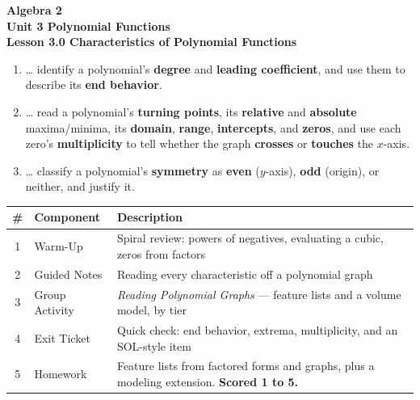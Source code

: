 \documentclass[10pt]{article}
\begin{document}
\vspace{-0.8in}

\begin{center}
  {\color{white}\textbf{\LARGE Algebra 2}}\\[4pt]
  {\color{forestmid}\large\textbf{Unit 3 \quad Polynomial Functions}}\\[6pt]
  {\color{white}\textbf{\large Lesson 3.0 \quad Characteristics of Polynomial Functions}}
\end{center}

\vspace{0.22in}
\namedateperiod
\vspace{0.18in}

\begin{learningtargetbox}
\small
\begin{enumerate}[leftmargin=1.5em, itemsep=5pt]
  \item \ldots{} identify a polynomial's \textbf{degree} and \textbf{leading coefficient}, and use them to describe its \textbf{end behavior}.
  \item \ldots{} read a polynomial's \textbf{turning points}, its \textbf{relative} and \textbf{absolute} maxima/minima, its \textbf{domain}, \textbf{range}, \textbf{intercepts}, and \textbf{zeros}, and use each zero's \textbf{multiplicity} to tell whether the graph \textbf{crosses} or \textbf{touches} the $x$-axis.
  \item \ldots{} classify a polynomial's \textbf{symmetry} as \textbf{even} ($y$-axis), \textbf{odd} (origin), or neither, and justify it.
\end{enumerate}
\end{learningtargetbox}

\vspace{0.14in}

\begin{tocbox}
\small
\renewcommand{\arraystretch}{1.5}
\begin{tabularx}{\linewidth}{@{} c l X @{}}
\rowcolor{forestbg}
\textbf{\#} & \textbf{Component} & \textbf{Description} \\
\midrule
1 & Warm-Up        & Spiral review: powers of negatives, evaluating a cubic, zeros from factors \\
2 & Guided Notes   & Reading every characteristic off a polynomial graph \\
3 & Group Activity & \emph{Reading Polynomial Graphs} --- feature lists and a volume model, by tier \\
4 & Exit Ticket    & Quick check: end behavior, extrema, multiplicity, and an SOL-style item \\
5 & Homework       & Feature lists from factored forms and graphs, plus a modeling extension. \textbf{Scored 1 to 5.} \\
\end{tabularx}
\end{tocbox}
\end{document}

